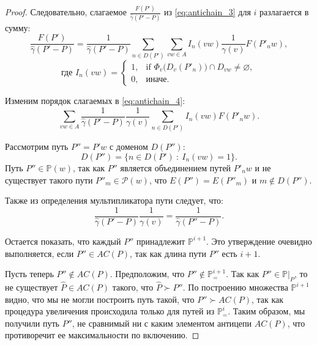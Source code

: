 \documentclass[../thesis.tex]{subfiles}
\begin{document}
\begin{proof}
Следовательно, слагаемое $\frac{F(P')}{\hat{\gamma}(P'-P)}$ из \eqref{eq:antichain_3} для $i$ разлагается в сумму:
\begin{equation} \label{eq:antichain_4}
    \frac{F(P')}{\hat{\gamma}(P'-P)}
    = \frac{1}{\hat{\gamma}(P'-P)}
      \sum_{n\in D(P')}
      {
        \sum_{vw\in A}
        {
            I_n(vw) \frac{1}{\gamma(v)} F(P'_n w)
        }
      },
\end{equation}
\begin{equation}
    \text{где } I_n(vw) = 
    \begin{cases}
        1, & \text{if } \Phi_v\big(D_v(P'_n)\big)\cap D_{vw}\neq \varnothing, \\
        0, & \text{иначе}.
    \end{cases}
\end{equation}

Изменим порядок слагаемых в \eqref{eq:antichain_4}:
\begin{equation} \label{eq:antichain_5}
    \sum_{vw\in A}
    {
        \frac{1}{\hat{\gamma}(P'-P)} \frac{1}{\gamma(v)}
        \sum_{n\in D(P')} { I_n(vw) } F(P'_n w)
    }.
\end{equation}

Рассмотрим путь $P'' = P'w$ с доменом $D(P'')$:
\begin{equation}
    D(P'') = \big\{ n\in D(P')\ :\ I_n(vw)=1 \big\}.
\end{equation}
Путь $P''\in\mathbb{P}(w)$, так как $P''$ является объединением путей $P'_n w$ и не существует такого пути $P''_m\in \mathcal{P}(w)$, что $E(P'') = E(P''_m)$ и $m\notin D(P'')$.

Также из определения мультипликатора пути следует, что:
\begin{equation}
    \frac{1}{\hat{\gamma}(P'-P)} \frac{1}{\gamma(v)} = \frac{1}{\hat{\gamma}(P''-P)}.
\end{equation}

Остается показать, что каждый $P''$ принадлежит $\mathbb{P}^{i+1}$.
Это утверждение очевидно выполняется, если $P''\in AC(P)$, так как длина пути $P''$ есть $i+1$.

Пусть теперь $P''\notin AC(P)$.
Предположим, что $P''\notin \mathbb{P}^{i+1}_{=}$.
Так как $P''\in\mathbb{P}|_P$, то не существует $\hat{P}\in AC(P)$ такого, что $\hat{P} \succ P''$.
По построению множества $\mathbb{P}^{i+1}$ видно, что мы не могли построить путь такой, что $P'' \succ AC(P)$, так как процедура увеличения происходила только для путей из $\mathbb{P}^{i}_{=}$.
Таким образом, мы получили путь $P''$, не сравнимый ни с каким элементом антицепи $AC(P)$, что противоречит ее максимальности по включению.


\end{proof}
\end{document}
